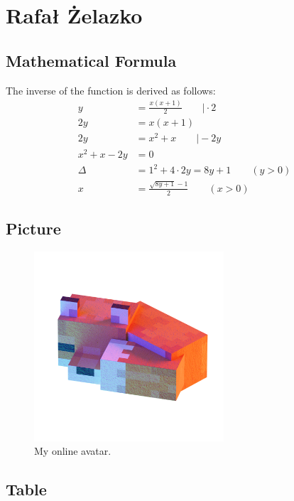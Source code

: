 \clearpage
\section{Rafał Żelazko}

\subsection{Mathematical Formula}
\label{raf:formula}

The inverse of the function is derived as follows:
\begin{equation*}
    \begin{split}
        y&=\frac{x(x+1)}{2} \qquad \Big| \cdot 2 \\
        2y&=x(x+1) \\
        2y&= x^2 + x \qquad \Big| -2y \\
        x^2 + x - 2y &= 0 \\
        \Delta &= 1^2 + 4 \cdot 2y = 8y + 1 \qquad (y > 0) \\
        x &= \frac{\sqrt{8y+1}-1}{2} \qquad (x > 0)
    \end{split}
\end{equation*}

\subsection{Picture}
\label{raf:picture}

\begin{figure}[h]
    \centering
    \includegraphics[height=200pt]{pictures/rayferric.png}
    \caption{My online avatar.}
\end{figure}

\subsection{Table}
\label{raf:table}


